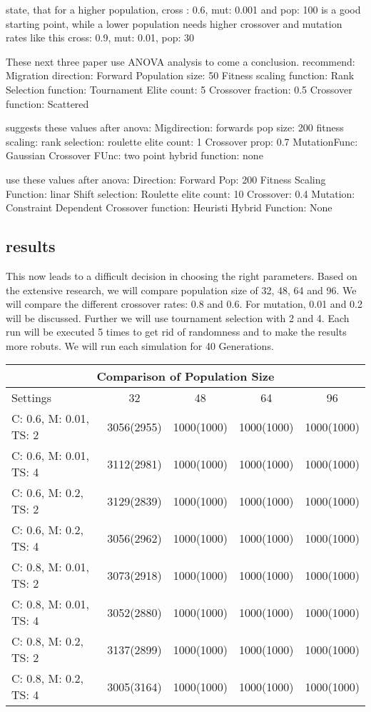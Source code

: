 \cite{srinivas_genetic_1994} state, that for a higher population, cross : 0.6, mut: 0.001 and pop: 100 is a good starting point, while a lower population needs higher crossover and mutation rates like this cross: 0.9, mut: 0.01, pop: 30

These next three paper use ANOVA analysis to come a conclusion. \cite{fazal_estimating_2005} recommend:
Migration direction: Forward
Population size: 50 
Fitness scaling function: Rank
Selection function: Tournament
Elite count: 5
Crossover fraction: 0.5
Crossover function: Scattered


\cite{dao_maximising_2016} suggests these values after anova:
Migdirection: forwards
pop size: 200
fitness scaling: rank
selection: roulette
elite count: 1
Crossover prop: 0.7
MutationFunc: Gaussian
Crossover FUnc: two point
hybrid function: none


\cite{assistant_professor_amity_university_jaipur_rajasthan_india_parameter_2019} use these values after anova:
Direction: Forward
Pop: 200 
Fitness Scaling Function: linar Shift
selection: Roulette 
elite count: 10 
Crossover: 0.4 
Mutation: Constraint Dependent 
Crossover function: Heuristi
Hybrid Function: None




\subsection{results}
This now leads to a difficult decision in choosing the right parameters. Based on the extensive research, we will compare population size of 32, 48, 64 and 96. We will compare the different crossover rates: 0.8 and 0.6. For mutation, 0.01 and 0.2 will be discussed. Further we will use tournament selection with 2 and 4.
Each run will be executed 5 times to get rid of randomness and to make the results more robuts. We will run each simulation for 40 Generations.


\begin{tabular}{ |l||c|c|c|c|  }
	\hline
	\multicolumn{5}{|c|}{ Comparison of Population Size} \\
	\hline
	Settings & 32 & 48 & 64 & 96\\
	\hline
	C: 0.6, M: 0.01, TS: 2   	& 3056(2955) & 1000(1000) & 1000(1000) & 1000(1000)\\
	C: 0.6, M: 0.01, TS: 4		& 3112(2981) & 1000(1000) & 1000(1000) & 1000(1000)\\
	C: 0.6, M: 0.2, TS: 2 		& 3129(2839) & 1000(1000) & 1000(1000) & 1000(1000)\\
	C: 0.6, M: 0.2, TS: 4    	& 3056(2962) & 1000(1000) & 1000(1000) & 1000(1000)\\
	C: 0.8, M: 0.01, TS: 2   	& 3073(2918) & 1000(1000) & 1000(1000) & 1000(1000)\\
	C: 0.8, M: 0.01, TS: 4		& 3052(2880) & 1000(1000) & 1000(1000) & 1000(1000)\\
	C: 0.8, M: 0.2, TS: 2 		& 3137(2899) & 1000(1000) & 1000(1000) & 1000(1000)\\
	C: 0.8, M: 0.2, TS: 4    	& 3005(3164) & 1000(1000) & 1000(1000) & 1000(1000)\\
	\hline
\end{tabular}

